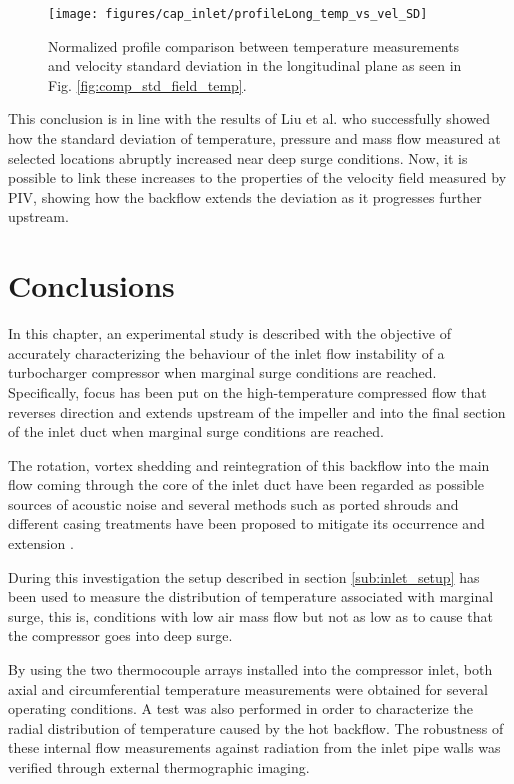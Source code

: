 \begin{figure}[thb!]
\centering
\texttt{[image: figures/cap\_inlet/profileLong\_temp\_vs\_vel\_SD]}
\caption{Normalized profile comparison between temperature measurements and velocity standard deviation in the longitudinal plane as seen in Fig. \ref{fig:comp_std_field_temp}.}
\label{fig:profiles_temp_vs_vel_long_SD}
\end{figure}

This conclusion is in line with the results of Liu et al. \cite{liu2013methods} who successfully showed how the standard deviation of temperature, pressure and mass flow measured at selected locations abruptly increased near deep surge conditions. Now, it is possible to link these increases to the properties of the velocity field measured by PIV, showing how the backflow extends the deviation as it progresses further upstream.

\section{Conclusions}

In this chapter, an experimental study is described with the objective of accurately characterizing the behaviour of the inlet flow instability of a turbocharger compressor when marginal surge conditions are reached. Specifically, focus has been put on the high-temperature compressed flow that reverses direction and extends upstream of the impeller and into the final section of the inlet duct when marginal surge conditions are reached.

The rotation, vortex shedding and reintegration of this backflow into the main flow coming through the core of the inlet duct have been regarded as possible sources of acoustic noise and several methods such as ported shrouds and different casing treatments have been proposed to mitigate its occurrence and extension \cite{chen2012casing,ding2013experimental}.

During this investigation the setup described in section \ref{sub:inlet_setup} has been used to measure the distribution of temperature associated with marginal surge, this is, conditions with low air mass flow but not as low as to cause that the compressor goes into deep surge.

By using the two thermocouple arrays installed into the compressor inlet, both axial and circumferential temperature measurements were obtained for several operating conditions. A test was also performed in order to characterize the radial distribution of temperature caused by the hot backflow. The robustness of these internal flow measurements against radiation from the inlet pipe walls was verified through external thermographic imaging.


